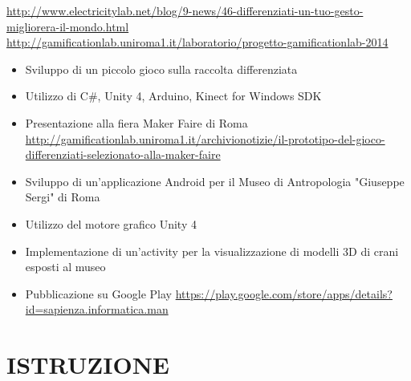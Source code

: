 \documentclass[11pt,a4paper,sans]{moderncv} %
\begin{document}
{
	\url{http://www.electricitylab.net/blog/9-news/46-differenziati-un-tuo-gesto-migliorera-il-mondo.html}
	\newline{}
	\url{http://gamificationlab.uniroma1.it/laboratorio/progetto-gamificationlab-2014}
	\begin{itemize}
		\item Sviluppo di un piccolo gioco sulla raccolta differenziata
		\item Utilizzo di C\#, Unity 4, Arduino, Kinect for Windows SDK
		\item Presentazione alla fiera Maker Faire di Roma
		\newline{} \url{http://gamificationlab.uniroma1.it/archivionotizie/il-prototipo-del-gioco-differenziati-selezionato-alla-maker-faire}
	\end{itemize}
}

{
	\begin{itemize}
		\item Sviluppo di un'applicazione Android per il Museo di Antropologia "Giuseppe Sergi" di Roma
		\item Utilizzo del motore grafico Unity 4
		\item Implementazione di un'activity per la visualizzazione di modelli 3D di crani esposti al museo
		\item Pubblicazione su Google Play
		\newline{}
		\url{https://play.google.com/store/apps/details?id=sapienza.informatica.man}
	\end{itemize}
}


\section{ISTRUZIONE}
{
}
\end{document}

